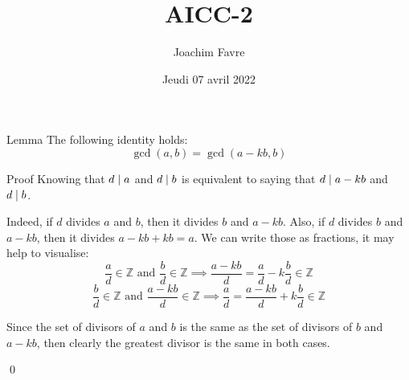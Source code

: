 \documentclass[a4paper]{article}
\title{AICC-2}
\author{Joachim Favre}
\date{Jeudi 07 avril 2022}
\begin{document}
\maketitle


\begin{parag}{Lemma}
    The following identity holds: 
    \[\gcd\left(a, b\right) = \gcd\left(a - kb, b\right)\]
    
    \begin{subparag}{Proof}
        Knowing that $d \mid a$ and $d \mid b$ is equivalent to saying that $d \mid a-kb$ and $d \mid b$.

        Indeed, if $d$ divides $a$ and $b$, then it divides $b$ and $a - kb$. Also, if $d$ divides $b$ and $a - kb$, then it divides $a - kb + kb = a$. We can write those as fractions, it may help to visualise: 
        \[\frac{a}{d} \in \mathbb{Z} \text{ and } \frac{b}{d} \in \mathbb{Z} \implies \frac{a - kb}{d} = \frac{a}{d} - k \frac{b}{d} \in \mathbb{Z}\] 
        \[\frac{b}{d} \in \mathbb{Z} \text{ and } \frac{a - kb}{d} \in \mathbb{Z} \implies \frac{a}{d} = \frac{a - kb}{d} + k \frac{b}{d} \in \mathbb{Z}\] 
        
        Since the set of divisors of $a$ and $b$ is the same as the set of divisors of $b$ and $a - kb$, then clearly the greatest divisor is the same in both cases.

        \qed
    \end{subparag}
\end{parag}
\end{document}
